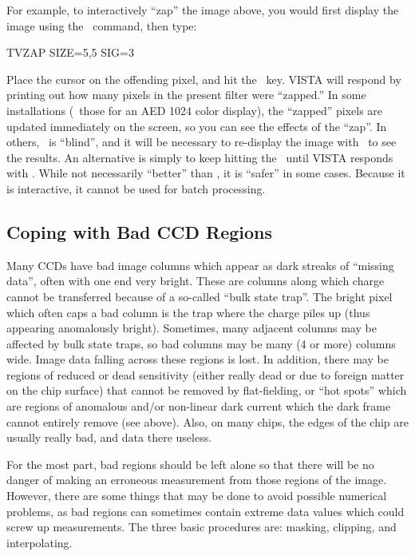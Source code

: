 For example, to interactively ``zap'' the image above, you would first display
the image using the \ command, then type: 
\begin{command}
      \item TVZAP SIZE=5,5 SIG=3
\end{command}
Place the cursor on the offending pixel, and hit the \ key. VISTA will
respond by printing out how many pixels in the present filter were ``zapped.''
In some installations (\eg\ those for an AED 1024 color display), the
``zapped'' pixels are updated immediately on the screen, so you can see the
effects of the ``zap''.  In others, \ is ``blind'', and it will be
necessary to re-display the image with \ to see the results.  An
alternative is simply to keep hitting the \ until VISTA responds
with .  While not necessarily ``better'' than
, it is ``safer'' in some cases.   Because it is interactive, it 
cannot be used for batch processing.


\subsection{Coping with Bad CCD Regions}
\label{sec:imbadspots}
Many CCDs have bad image columns which appear as dark streaks of ``missing
data'', often with one end very bright.  These are columns along which charge
cannot be transferred because of a so-called ``bulk state trap''.  The bright
pixel which often caps a bad column is the trap where the charge piles up
(thus appearing anomalously bright).  Sometimes, many adjacent columns may be
affected by bulk state traps, so bad columns may be many (4 or more) columns
wide.  Image data falling across these regions is lost.  In addition, there
may be regions of reduced or dead sensitivity (either really dead or due to
foreign matter on the chip surface) that cannot be removed by flat-fielding,
or ``hot spots'' which are regions of anomalous and/or non-linear dark current
which the dark frame cannot entirely remove (see above).  Also, on many chips,
the edges of the chip are usually really bad, and data there useless.

For the most part, bad regions should be left alone so that there will be no
danger of making an erroneous measurement from those regions of the image. 
However, there are some things that may be done to avoid possible numerical
problems, as bad regions can sometimes contain extreme data values which could
screw up measurements.  The three basic procedures are: masking, clipping, and
interpolating. 

